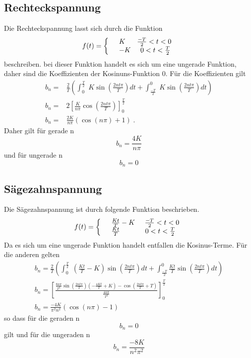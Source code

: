 \subsection{Rechteckspannung}
\label{sec:Rechteckspannung}
Die Rechteckspannung lasst sich durch die Funktion
\begin{equation*}
  f(t)=\left\{
  \begin{array}{l l}
    &K   \;\;\;\;\;\;\frac{-T}{2}<t<0 \\
    &-K  \;\;\;\;\;0<t<\frac{T}{2}
  \end{array}
  \right.
\end{equation*}
beschreiben. bei dieser Funktion handelt es sich um eine ungerade Funktion, daher
sind die Koeffizienten der Kosinuns-Funktion $0$. Für die Koeffizienten gilt
\begin{align*}
  b_n=&\frac{2}{T}\left(\int^{\frac{T}{2}}_0\;K\sin\left(\frac{2nt\pi}{T}\right)dt+
\int^0_{\frac{-T}{2}}\;K\sin\left(\frac{2nt\pi}{T}\right)dt\right)\\
  b_n=&2\left[ \frac{K}{n\pi}\cos\left(\frac{2nt\pi}{T}\right)\right]^{\frac{T}{2}}_0\\
  b_n=&\frac{2K}{n\pi}(\cos(n\pi)+1)\;.
\end{align*}
Daher gilt für gerade n
\begin{equation}
  b_n=\frac{4K}{n\pi}
\end{equation}
 und für ungerade n
\begin{equation}
  b_n=0
\end{equation}
\subsection{Sägezahnspannung}
\label{sec:Saegezahnspannung}
Die Sägezahnspannung ist durch folgende Funktion beschrieben.
\begin{equation*}
  f(t)=\left\{
  \begin{array}{l l}
    &\frac{Kt}{T}-K   \;\;\;\;\;\frac{-T}{2}<t<0 \\
    &\frac{Kt}{T}   \;\;\;\;\;\;\;\;\;\;\;\;\;0<t<\frac{T}{2}
  \end{array}
  \right.
\end{equation*}
Da es sich um eine ungerade Funktion handelt entfallen die Kosinus-Terme. Für die
anderen gelten
\begin{align*}
  b_n=\frac{2}{T}\left(\int^{\frac{T}{2}}_0\;\left(\frac{Kt}{T}-K\right)
  \sin\left(\frac{2nt\pi}{T}\right)dt +\int^0_{\frac{-T}{2}}\frac{Kt}{T}
  \sin\left(\frac{2nt\pi}{T}\right)dt\right)\\
  b_n=\left[\frac{\frac{8n\pi}{T^2}\sin(\frac{2nt\pi}{T})(-\frac{4Kt}{T}+K)
  -\cos(\frac{2nt\pi}{T}+T)}{\frac{4n\pi}{T^2}}\right]^{\frac{T}{2}}_0\\
  b_n=\frac{-4K}{\pi^2n^2}(\cos(n\pi)-1)
\end{align*}
so dass für die geraden n
\begin{equation}
  b_n=0
\end{equation}
gilt und für die ungeraden n
\begin{equation}
  b_n=\frac{-8K}{n^2\pi^2}
\end{equation}
